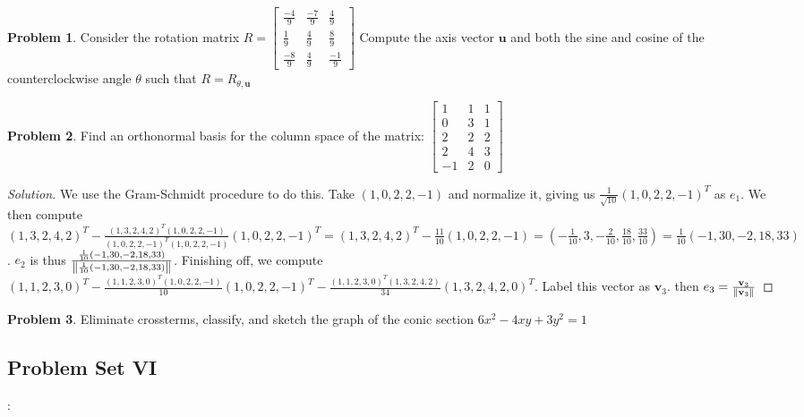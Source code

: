 \documentclass[oneside]{book}
\theoremstyle{definition}
\newtheorem{problem}{Problem}[section]
\begin{document}
\begin{problem}
Consider the rotation matrix $R = \begin{bmatrix} \frac{-4}{9} & \frac{-7}{9} & \frac{4}{9} \\ \frac{1}{9} & \frac{4}{9} & \frac{8}{9} \\ \frac{-8}{9} & \frac{4}{9} & \frac{-1}{9} \end{bmatrix}$ Compute the axis vector $\textbf{u}$ and both the sine and cosine of the counterclockwise angle $\theta$ such that $R = R_{\theta,\textbf{u}}$
\end{problem}

\begin{problem}
Find an orthonormal basis for the column space of the matrix: $\begin{bmatrix} 1 & 1 & 1 \\ 0 & 3 & 1 \\ 2 & 2 & 2 \\ 2 & 4 & 3 \\ -1 & 2 & 0 \end{bmatrix}$
\end{problem}
\begin{proof}[Solution]
We use the Gram-Schmidt procedure to do this. Take $(1,0,2,2,-1)$ and normalize it, giving us $\frac{1}{\sqrt{10}}(1,0,2,2,-1)^T$ as $e_1$. We then compute $(1,3,2,4,2)^T - \frac{(1,3,2,4,2)^T(1,0,2,2,-1)}{(1,0,2,2,-1)^T (1,0,2,2,-1)}(1,0,2,2,-1)^T = (1,3,2,4,2)^T-\frac{11}{10}(1,0,2,2,-1)=(-\frac{1}{10},3,-\frac{2}{10},\frac{18}{10},\frac{33}{10}) = \frac{1}{10}(-1,30,-2,18,33)$. $e_2$ is thus $\frac{ \frac{1}{10}(-1,30,-2,18,33)}{\norm{ \frac{1}{10}(-1,30,-2,18,33)}}$. Finishing off, we compute $(1,1,2,3,0)^T - \frac{(1,1,2,3,0)^T(1,0,2,2,-1)}{10}(1,0,2,2,-1)^T - \frac{(1,1,2,3,0)^T(1,3,2,4,2)}{34}(1,3,2,4,2,0)^T$. Label this vector as $\textbf{v}_3$. then $e_3 = \frac{\textbf{v}_3}{\norm{\textbf{v}_3}}$
\end{proof}

\begin{problem}
Eliminate crossterms, classify, and sketch the graph of the conic section $6x^2 - 4xy+3y^2 = 1$
\end{problem}

\subsection*{Problem Set VI}:
\end{document}

